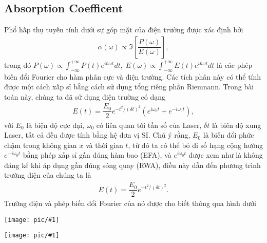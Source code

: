 \documentclass{article}
\newcommand{\image}[1]{
	\begin{center}
		\texttt{[image: pic/\#1]}
	\end{center}
}
\newcommand{\f}[2]{\dfrac{#1}{#2}}
\begin{document}
\subsection{Absorption Coefficent}
Phổ hấp thụ tuyến tính dưới sự góp mặt của điện trường được xác định bởi \cite{doi:10.1142/7184}
\begin{gather}
	\alpha(\omega) \propto \Im\left[\f{P(\omega)}{E(\omega)}\right],
\end{gather}
trong đó $P(\omega) \propto \int_{-\infty}^{+\infty} P(t) e^{i \hbar \omega t} dt, \; E(\omega) \propto \int_{-\infty}^{+\infty} E(t) e^{i \hbar \omega t} dt$ là các phép biến đổi Fourier cho hàm phân cực và điện trường. Các tích phân này có thể tính được một cách xấp sỉ bằng cách sử dụng tổng riêng phần Riemnann. Trong bài toán này, chúng ta đã sử dụng điện trường có dạng
\begin{gather}
	E(t) = \f{E_{0}}{2} e^{- t^{2} / (\delta t)^{2}} (e^{i\omega_{0} t} + e^{-i\omega_{0} t}),
\end{gather}
với $E_{0}$ là biện độ cực đại, $\omega_{0}$ có liên quan tới tần số của Laser, $\delta t$ là biên độ xung Laser, tất cả đều được tính bằng hệ đơn vị SI. Chú ý rằng, $E_{0}$ là biến đổi phức chậm trong không gian $x$ và thời gian $t$, từ đó ta có thể bỏ đi số hạng cộng hưởng $e^{-i \omega_{0} t}$ bằng phép xấp sỉ gần đúng hàm bao (EFA), và $e^{i \omega_{0} t}$ được xem như là không đáng kể khi áp dụng gần đúng sóng quay (RWA), điều này dẫn đến phương trình trường điện của chúng ta là
\begin{gather}
	E(t) = \f{E_{0}}{2} e^{-t^{2} / (\delta t)^{2}}.
\end{gather}
Trường điện và phép biến đổi Fourier của nó được cho biết thông qua hình dưới
\image{electricfield.pdf}
\image{electricfieldFT.pdf}






 





























	
	
	
\end{document}
